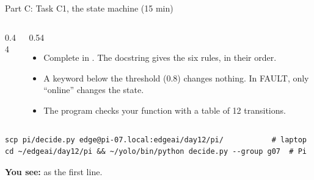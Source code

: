 \begin{frame}[fragile]{Part C: Task C1, the state machine (15 min)}
  \begin{columns}[c]
    \begin{column}{0.44\textwidth}
      \centering
    \end{column}
    \begin{column}{0.54\textwidth}
      \small
      \begin{itemize}
        \item Complete  in . The
              docstring gives the six rules, in their order.
        \item A keyword below the threshold (0.8) changes nothing. In FAULT,
              only ``online'' changes the state.
        \item The program checks your function with a table of 12
              transitions.
      \end{itemize}
    \end{column}
  \end{columns}
\begin{lstlisting}[style=shell]
scp pi/decide.py edge@pi-07.local:edgeai/day12/pi/           # laptop
cd ~/edgeai/day12/pi && ~/yolo/bin/python decide.py --group g07  # Pi
\end{lstlisting}
  \small
  \textbf{You see:}  as the first line.
\end{frame}

